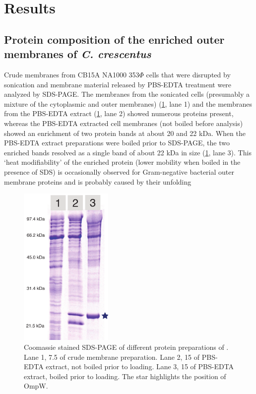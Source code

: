 \section{Results}

\subsection{Protein composition of the enriched outer membranes of \textit{C. crescentus}}
Crude membranes from \caulobacter CB15A NA1000 353$\Phi$ cells that were disrupted by sonication and membrane material released by \ac{PBS}-\ac{EDTA} treatment were analyzed by \ac{SDS-PAGE}. The membranes from the sonicated cells (presumably a mixture of the cytoplasmic and outer membranes) (\cref{fig:porin-pbsedtagel}, lane 1) and the membranes from the \ac{PBS}-\ac{EDTA} extract (\cref{fig:porin-pbsedtagel}, lane 2) showed numerous proteins present, whereas the \ac{PBS}-\ac{EDTA} extracted cell membranes (not boiled before analysis) showed an enrichment of two protein bands at about 20 and 22 kDa. When the \ac{PBS}-\ac{EDTA} extract preparations were boiled prior to \ac{SDS-PAGE}, the two enriched bands resolved as a single band of about 22 kDa in size (\cref{fig:porin-pbsedtagel}, lane 3). This `heat modifiability' of the enriched protein (\ie lower mobility when boiled in the presence of \textsc{SDS}) is occasionally observed for Gram-negative bacterial outer membrane proteins and is probably caused by their unfolding

\begin{figure}[H]
  	\begin{center}
   		\includegraphics[width=0.4\textwidth]{porin_chapter/img/Fig1-pbsedta.pdf}
   	\end{center}
   	\caption[Coomassie stained \ac{SDS-PAGE} of different protein preparations of \caulobacter.]{
	   	Coomassie stained \ac{SDS-PAGE} of different protein preparations of \caulobacter. 
Lane 1, 7.5 \microlitre of crude membrane preparation. Lane 2, 15 \microlitre of \ac{PBS}-\ac{EDTA} extract, not boiled prior to loading. Lane 3, 15 \microlitre of \ac{PBS}-\ac{EDTA} extract, boiled prior to loading. The star highlights the position of OmpW.
 	}
   	\label{fig:porin-pbsedtagel}
\end{figure}   

